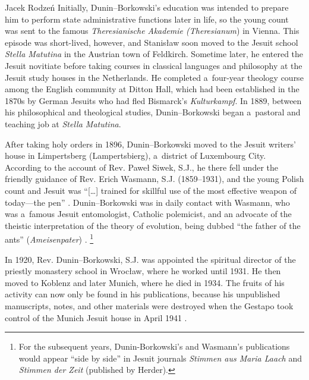 \begin{artengenv}{Jacek Rodzeń}
Initially, Dunin–Borkowski's education was intended to prepare him to perform state administrative functions later in life, so the young count was sent to the famous \textit{Theresianische Akademie (Theresianum}) in Vienna. This episode was short-lived, however, and Stanisław soon moved to the Jesuit school \textit{Stella Matutina} in the Austrian town of Feldkirch. Sometime later, he entered the Jesuit novitiate before taking courses in classical languages and philosophy at the Jesuit study houses in the Netherlands. He completed a~four-year theology course among the English community at Ditton Hall, which had been established in the 1870s by German Jesuits who had fled Bismarck's \textit{Kulturkampf}. In 1889, between his philosophical and theological studies, Dunin–Borkowski began a~pastoral and teaching job at \textit{Stella Matutina}.

After taking holy orders in 1896, Dunin–Borkowski moved to the Jesuit writers' house in Limpertsberg (Lampertsbierg), a~district of Luxembourg City. According to the account of Rev. Paweł Siwek, S.J., he there fell under the friendly guidance of Rev. Erich Wasmann, S.J. (1859–1931), and the young Polish count and Jesuit was ``[…] trained for skillful use of the most effective weapon of today---the pen''
\parencite[][p.137]{siwek_stanislaw_1935}. %
 Dunin–Borkowski was in daily contact with Wasmann, who was a~famous Jesuit entomologist, Catholic polemicist, and an advocate of the theistic interpretation of the theory of evolution, being dubbed ``the father of the ants'' (\textit{Ameisenpater}) 
\parencites[for more on Wasmann's activity see][]{baranzke_erich_1999}[][]{polak_spor_2007}.%
\footnote{For the subsequent years, Dunin-Borkowski's and Wasmann's publications would appear ``side by side'' in Jesuit journals \textit{Stimmen aus Maria Laach} and \textit{Stimmen der Zeit} (published by Herder).}

In 1920, Rev. Dunin–Borkowski, S.J. was appointed the spiritual director of the priestly monastery school in Wrocław, where he worked until 1931. He then moved to Koblenz and later Munich, where he died in 1934. The fruits of his activity can now only be found in his publications, because his unpublished manuscripts, notes, and other materials were destroyed when the Gestapo took control of the Munich Jesuit house in April 1941
\parencite[][]{stasiewski_dunin-borkowski_1959}.%



\end{artengenv}
